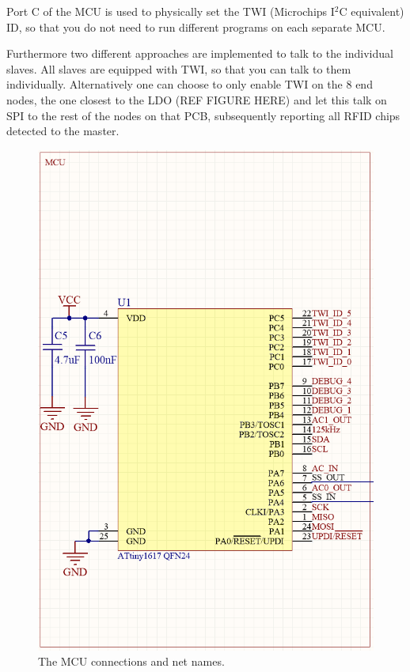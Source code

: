 Port C of the MCU is used to physically set the TWI (Microchips I$^2$C equivalent) ID, so that you do not need to run different programs on each separate MCU.

Furthermore two different approaches are implemented to talk to the individual slaves. All slaves are equipped with TWI, so that you can talk to them individually. Alternatively one can choose to only enable TWI on the 8 end nodes, the one closest to the LDO (REF FIGURE HERE) and let this talk on SPI to the rest of the nodes on that PCB, subsequently reporting all RFID chips detected to the master.

\begin{figure}[H]
    \centering
    \includegraphics[width=\textwidth]{05_My_Implementation/figures/MCU.png}
    \caption{The MCU connections and net names.}
    \label{fig:05:MCU}
\end{figure}



